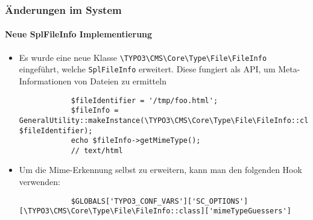 
\begin{frame}[fragile]
	\frametitle{Änderungen im System}
	\framesubtitle{Neue SplFileInfo Implementierung}

	\begin{itemize}
		\item Es wurde eine neue Klasse \lstinline{\TYPO3\CMS\Core\Type\File\FileInfo} eingeführt, welche \texttt{SplFileInfo} erweitert. Diese fungiert als API, um Meta-Informationen von Dateien zu ermitteln

		\begin{lstlisting}
			$fileIdentifier = '/tmp/foo.html';
  			$fileInfo = GeneralUtility::makeInstance(\TYPO3\CMS\Core\Type\File\FileInfo::class, $fileIdentifier);
  			echo $fileInfo->getMimeType();
  			// text/html
		\end{lstlisting}

		\item Um die Mime-Erkennung selbst zu erweitern, kann man den folgenden Hook verwenden:
		\begin{lstlisting}
			$GLOBALS['TYPO3_CONF_VARS']['SC_OPTIONS'][\TYPO3\CMS\Core\Type\File\FileInfo::class]['mimeTypeGuessers']
		\end{lstlisting}
	\end{itemize}

\end{frame}


